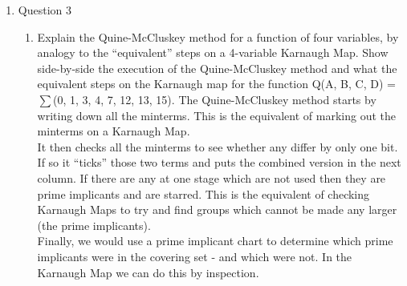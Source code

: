 \documentclass[10pt,\jkfside,a4paper]{article}
\begin{document}
\begin{enumerate}
\item Question 3
\begin{enumerate}
\item{Explain the Quine-McCluskey method for a function of four variables, by analogy to the
“equivalent” steps on a 4-variable Karnaugh Map. Show side-by-side the execution of the
Quine-McCluskey method and what the equivalent steps on the Karnaugh map for the
function Q(A, B, C, D) = $\sum$(0, 1, 3, 4, 7, 12, 13, 15).}
The Quine-McCluskey method starts by writing down all the minterms. This is the equivalent of marking out the minterms on a Karnaugh Map.\\
It then checks all the minterms to see whether any differ by only one bit. If so it ``ticks'' those two terms and puts the combined version in the next column. If there are any at one stage which are not used then they are prime implicants and are starred. This is the equivalent of checking Karnaugh Maps to try and find groups which cannot be made any larger (the prime implicants).\\
Finally, we would use a prime implicant chart to determine which prime implicants were in the covering set - and which were not. In the Karnaugh Map we can do this by inspection.


\end{enumerate}
\end{enumerate}
\end{document}
